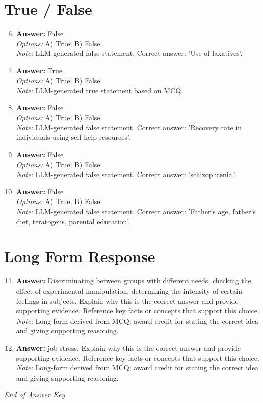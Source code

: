 \documentclass[12pt]{article}
\begin{document}
\section*{True / False}
\begin{enumerate}[label=\arabic*.]
\setcounter{enumi}{5}
\item \textbf{Answer:} False
\\ \textit{Options:} A) True; B) False
\\ \textit{Note:} LLM-generated false statement. Correct answer: 'Use of laxatives'.
\item \textbf{Answer:} True
\\ \textit{Options:} A) True; B) False
\\ \textit{Note:} LLM-generated true statement based on MCQ.
\item \textbf{Answer:} False
\\ \textit{Options:} A) True; B) False
\\ \textit{Note:} LLM-generated false statement. Correct answer: 'Recovery rate in individuals using self-help resources'.
\item \textbf{Answer:} False
\\ \textit{Options:} A) True; B) False
\\ \textit{Note:} LLM-generated false statement. Correct answer: 'schizophrenia.'.
\item \textbf{Answer:} False
\\ \textit{Options:} A) True; B) False
\\ \textit{Note:} LLM-generated false statement. Correct answer: 'Father's age, father's diet, teratogens, parental education'.
\end{enumerate}

\section*{Long Form Response}
\begin{enumerate}[label=\arabic*.]
\setcounter{enumi}{10}
\item \textbf{Answer:} Discriminating between groups with different needs, checking the effect of experimental manipulation, determining the intensity of certain feelings in subjects. Explain why this is the correct answer and provide supporting evidence. Reference key facts or concepts that support this choice.
\\ \textit{Note:} Long-form derived from MCQ; award credit for stating the correct idea and giving supporting reasoning.
\item \textbf{Answer:} job stress. Explain why this is the correct answer and provide supporting evidence. Reference key facts or concepts that support this choice.
\\ \textit{Note:} Long-form derived from MCQ; award credit for stating the correct idea and giving supporting reasoning.
\end{enumerate}

\vfill
\noindent\textit{End of Answer Key}
\end{document}
